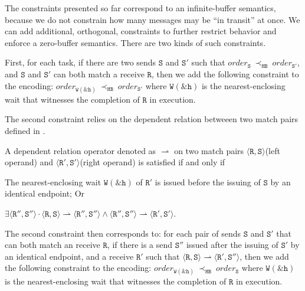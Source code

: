 The constraints presented so far correspond to an infinite-buffer
semantics, because we do not constrain how many messages may be ``in
transit'' at once. We can add additional, orthogonal, constraints to
further restrict behavior and enforce a zero-buffer semantics. There are
two kinds of such constraints.

First, for each task, if there are two sends $\mathtt{S}$ and
$\mathtt{S'}$ such that
$\mathit{order}_\mathtt{S}\ \mathrm{\prec_\mathtt{HB}}\ \mathit{order}_\mathtt{S'}$,
and $\mathtt{S}$ and $\mathtt{S'}$ can both match a receive
$\mathtt{R}$, then we add the following constraint to the encoding:
$\mathit{order}_{\mathtt{W(\&h)}}\ \mathrm{\prec_{\mathtt{HB}}}\ \mathit{order}_{\mathtt{S'}}$
where $\mathtt{W(\&h)}$ is the nearest-enclosing wait that witnesses the
completion of $\mathtt{R}$ in execution.

The second constraint relies on the dependent relation betweeen two match pairs defined in .
\begin{definition}
A dependent relation operator denoted as $\rightharpoonup$ on two match pairs $\langle\mathtt{R}, \mathtt{S}\rangle$(left operand) and $\langle\mathtt{R'}, \mathtt{S'}\rangle$(right operand) is satisfied if and only if
\begin{compactenum}
\item The nearest-enclosing wait $\mathtt{W(\&h)}$ of $\mathtt{R'}$ is issued before the issuing of $\mathtt{S}$ by an identical endpoint; Or
\item $\exists\langle\mathtt{R''}, \mathtt{S''}\rangle\cdot\langle\mathtt{R}, \mathtt{S}\rangle \rightharpoonup \langle\mathtt{R''}, \mathtt{S''}\rangle\wedge\langle\mathtt{R''}, \mathtt{S''}\rangle \rightharpoonup \langle\mathtt{R'}, \mathtt{S'}\rangle$.
\end{compactenum}
\label{def:matchrelation}
\end{definition}
The second constraint then corresponds to: for each pair of sends $\mathtt{S}$ and $\mathtt{S'}$ that can both match an receive $\mathtt{R}$, if there is a send $\mathtt{S''}$ issued after the issuing of $\mathtt{S'}$ by an identical endpoint, and a receive $\mathtt{R'}$ such that $\langle\mathtt{R}, \mathtt{S}\rangle\rightharpoonup\langle\mathtt{R'}, \mathtt{S''}\rangle$, then we add the following constraint to the encoding: $\mathit{order}_{\mathtt{W(\&h)}}\ \mathrm{\prec_{\mathtt{HB}}}\ \mathit{order}_{\mathtt{S}}$
where $\mathtt{W(\&h)}$ is the nearest-enclosing wait that witnesses the
completion of $\mathtt{R}$ in execution.


